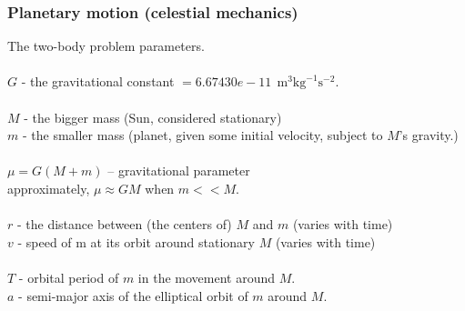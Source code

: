 \documentclass[aspectratio=169,xcolor=pdftex,dvipsnames]{beamer} %
\begin{document}
\begin{frame}
\frametitle{Planetary motion (celestial mechanics)}

The two-body problem parameters.\ \\
\ \\
$G$ - the gravitational constant $= 6.67430e\!-\!11\ \ \text{m}^3 \text{kg}^{-1} \text{s}^{-2}$.\\
\ \\
$M$ - the bigger mass (Sun, considered stationary)\\
$m$ - the smaller mass (planet, given some initial velocity, subject to $M$'s gravity.)\\
\ \\
$\mu = G(M+m)$ -- gravitational parameter\\
approximately,  $\mu \approx GM$ when $m <\!\!< M$.\\
\ \\
$r$ - the distance between (the centers of) $M$ and $m$ (varies with time)\\
$v$ - speed of m at its orbit around stationary $M$ (varies with time)\\
\ \\
$T$ - orbital period of $m$ in the movement around $M$.\\
$a$ - semi-major axis of the elliptical orbit of $m$ around $M$.

\end{frame}
\end{document}
